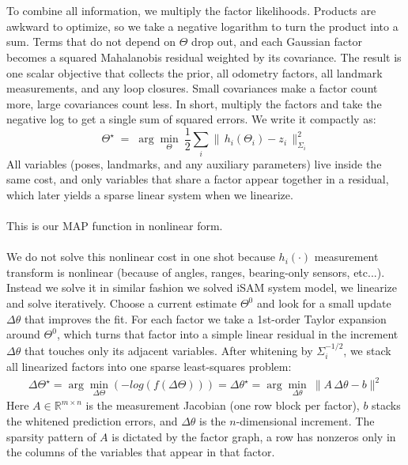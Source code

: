 \\ \\
To combine all information, we multiply the factor likelihoods. Products are awkward to optimize, so we take a negative logarithm to turn the product into a sum. Terms that do not depend on $\Theta$ drop out, and each Gaussian factor becomes a squared Mahalanobis residual weighted by its covariance. The result is one scalar objective that collects the prior, all odometry factors, all landmark measurements, and any loop closures. Small covariances make a factor count more, large covariances count less. In short, multiply the factors and take the negative log to get a single sum of squared errors. We write it compactly as:
\[
    \Theta^\star \;=\;\arg\min_{\Theta}\ \frac12\sum_i \|\,h_i(\Theta_i)-z_i\,\|^2_{\Sigma_i}
\]
All variables (poses, landmarks, and any auxiliary parameters) live inside the same cost, and only variables that share a factor appear together in a residual, which later yields a sparse linear system when we linearize.
\\ \\
This is our MAP function in nonlinear form.
\\ \\
We do not solve this nonlinear cost in one shot because $h_i(\cdot)$ measurement transform is nonlinear (because of angles, ranges, bearing-only sensors, etc...). Instead we solve it in similar fashion we solved iSAM system model, we linearize and solve iteratively. Choose a current estimate $\Theta^0$ and look for a small update $\Delta\theta$ that improves the fit. For each factor we take a 1st-order Taylor expansion around $\Theta^0$, which turns that factor into a simple linear residual in the increment $\Delta\theta$ that touches only its adjacent variables. After whitening by $\Sigma_i^{-1/2}$, we stack all linearized factors into one sparse least-squares problem:
\begin{equation}
    \begin{aligned}
        \Delta\Theta^\star = \arg\min_{\Delta\Theta} \left( -log\left(f(\Delta\Theta)\right) \right) = \Delta\theta^\star = \arg\min_{\Delta\theta}\ \|A\,\Delta\theta - b\|^2
    \end{aligned}
    \label{eq:optimizer-iSAM2-least-square}
\end{equation}
Here $A\in\mathbb{R}^{m\times n}$ is the measurement Jacobian (one row block per factor), $b$ stacks the whitened prediction errors, and $\Delta\theta$ is the $n$-dimensional increment. The sparsity pattern of $A$ is dictated by the factor graph, a row has nonzeros only in the columns of the variables that appear in that factor.
